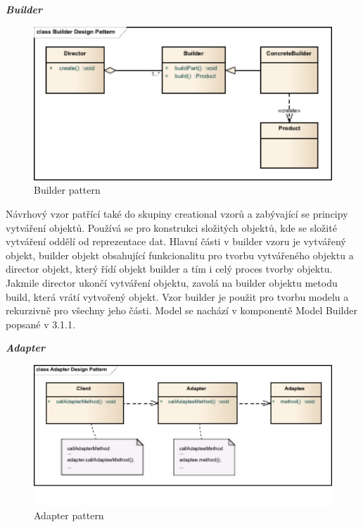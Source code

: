 \documentclass[11pt,twoside,a4paper]{book}
\begin{document}
\textbf{\textit{Builder}}

\begin{figure}[h]
\begin{center}
\includegraphics[width=13cm]{images-pdf/Builder-Design-Pattern.pdf}
\caption{Builder pattern}
\label{fig:logo}
\end{center}
\end{figure}

Návrhový vzor patřící také do skupiny creational vzorů a zabývající se 
principy vytváření objektů. Používá se pro konstrukci složitých objektů, 
kde se složité vytváření oddělí od reprezentace dat. Hlavní části v builder 
vzoru je vytvářený objekt, builder objekt obsahující funkcionalitu pro 
tvorbu vytvářeného objektu a director objekt, který řídí objekt builder 
a tím i celý proces tvorby objektu. Jakmile director ukončí vytváření objektu, 
zavolá na builder objektu metodu build, která vrátí vytvořený objekt. Vzor 
builder je použit pro tvorbu modelu a rekurzivně pro všechny jeho části. 
Model se nachází v komponentě Model Builder popsané v 3.1.1.

\textbf{\textit{Adapter}}

\begin{figure}[h]
\begin{center}
\includegraphics[width=13cm]{images-pdf/Adapter-Design-Pattern.pdf}
\caption{Adapter pattern}
\label{fig:logo}
\end{center}
\end{figure}
\end{document}
